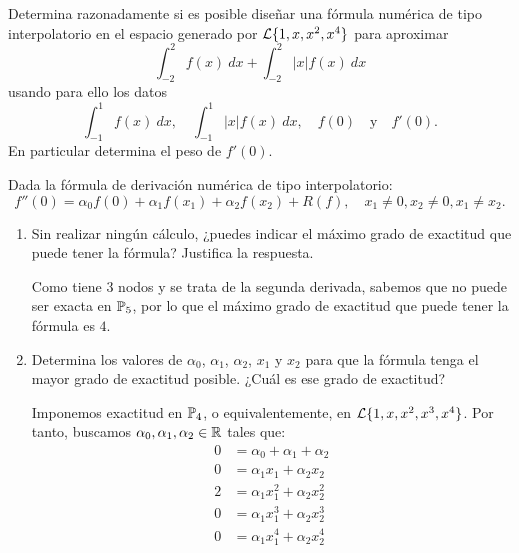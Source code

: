 \begin{ejercicio}\label{ej:2.2.4}
    Determina razonadamente si es posible diseñar una fórmula numérica de tipo interpolatorio en el espacio generado por $\mathcal{L}\{1, x, x^2, x^4\}$ para aproximar
    \[
    \int_{-2}^{2} f(x) \ d{x} + \int_{-2}^{2} |x|f(x) \ d{x}
    \]
    usando para ello los datos
    \[
    \int_{-1}^{1} f(x) \ d{x}, \quad \int_{-1}^{1} |x|f(x) \ d{x}, \quad f(0) \quad \text{y} \quad f'(0).
    \]
    En particular determina el peso de $f'(0)$.
\end{ejercicio}

\begin{ejercicio}\label{ej:2.2.5}
    Dada la fórmula de derivación numérica de tipo interpolatorio:
    \[
    f''(0) = \alpha_0 f(0) + \alpha_1 f(x_1) + \alpha_2 f(x_2) + R(f), \quad x_1 \neq 0, x_2 \neq 0, x_1 \neq x_2.
    \]
    \begin{enumerate}
        \item Sin realizar ningún cálculo, ¿puedes indicar el máximo grado de exactitud que puede tener la fórmula? Justifica la respuesta.
        
        Como tiene $3$ nodos y se trata de la segunda derivada, sabemos que no puede ser exacta en $\mathbb{P}_5$, por lo que el máximo grado de exactitud que puede tener la fórmula es $4$.
        
        \item Determina los valores de $\alpha_0$, $\alpha_1$, $\alpha_2$, $x_1$ y $x_2$ para que la fórmula tenga el mayor grado de exactitud posible. ¿Cuál es ese grado de exactitud?
        
        Imponemos exactitud en $\mathbb{P}_4$, o equivalentemente, en $\mathcal{L}\{1, x, x^2,x^3,x^4\}$. Por tanto, buscamos $\alpha_0,\alpha_1,\alpha_2\in\mathbb{R}$ tales que:
        \begin{align*}
            0 &= \alpha_0 + \alpha_1 + \alpha_2 \\
            0 &= \alpha_1x_1 + \alpha_2x_2 \\
            2 &= \alpha_1x_1^2 + \alpha_2x_2^2 \\
            0 &= \alpha_1x_1^3 + \alpha_2x_2^3\\
            0 &= \alpha_1x_1^4 + \alpha_2x_2^4
        \end{align*}


\end{enumerate}
\end{ejercicio}
